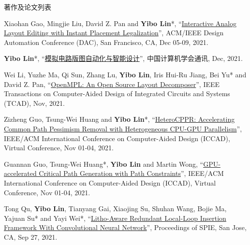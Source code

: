 \begin{rSection}{著作及论文列表}
\begin{description}[font=\normalfont, rightmargin=2em]
{}
            

\item[{[C80]}]{
        Xiaohan Gao, Mingjie Liu, David Z. Pan and \textbf{Yibo Lin}*, 
    ``\href{https://doi.org/10.1109/DAC18074.2021.9586234}{Interactive Analog Layout Editing with Instant Placement Legalization}'', 
    ACM/IEEE Design Automation Conference (DAC), San Francisco, CA, Dec 05-09, 2021.
    
}
            

\item[{[J79]}]{
        \textbf{Yibo Lin}*, 
    ``\href{https://dl.ccf.org.cn/article/articleDetail.html?type=xhtx_thesis&_ack=1&id=5743150191429632}{模拟电路版图自动化与智能设计}'', 
    中国计算机学会通讯, Dec, 2021.
    
}
            

\item[{[J78]}]{
        Wei Li, Yuzhe Ma, Qi Sun, Zhang Lu, \textbf{Yibo Lin}, Iris Hui-Ru Jiang, Bei Yu* and David Z. Pan, 
    ``\href{https://doi.org/10.1109/TCAD.2020.3042175}{OpenMPL: An Open Source Layout Decomposer}'', 
    IEEE Transactions on Computer-Aided Design of Integrated Circuits and Systems (TCAD), Nov, 2021.
    
}
            

\item[{[C77]}]{
        Zizheng Guo, Tsung-Wei Huang and \textbf{Yibo Lin}*, 
    ``\href{https://doi.org/10.1109/ICCAD51958.2021.9643457}{HeteroCPPR: Accelerating Common Path Pessimism Removal with Heterogeneous CPU-GPU Parallelism}'', 
    IEEE/ACM International Conference on Computer-Aided Design (ICCAD), Virtual Conference, Nov 01-04, 2021.
    
}
            

\item[{[C76]}]{
        Guannan Guo, Tsung-Wei Huang*, \textbf{Yibo Lin} and Martin Wong, 
    ``\href{https://doi.org/10.1109/ICCAD51958.2021.9643504}{GPU-accelerated Critical Path Generation with Path Constraints}'', 
    IEEE/ACM International Conference on Computer-Aided Design (ICCAD), Virtual Conference, Nov 01-04, 2021.
    
}
            

\item[{[C75]}]{
        Tong Qu, \textbf{Yibo Lin}, Tianyang Gai, Xiaojing Su, Shuhan Wang, Bojie Ma, Yajuan Su* and Yayi Wei*, 
    ``\href{https://doi.org/10.1117/12.2601685}{Litho-Aware Redundant Local-Loop Insertion Framework With Convolutional Neural Network}'', 
    Proceedings of SPIE, San Jose, CA, Sep 27, 2021.
    
}
\end{description}
\end{rSection}
